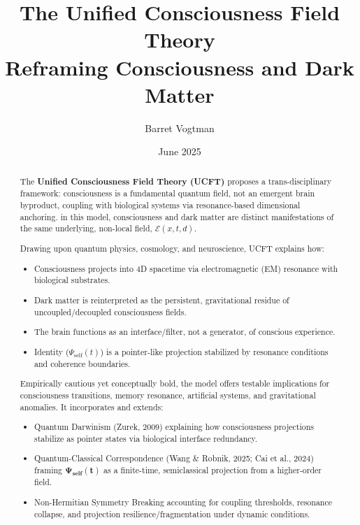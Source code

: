 \documentclass[titlepage]{article}
\title{The Unified Consciousness Field Theory\\
\large Reframing Consciousness and Dark Matter}
\author{Barret Vogtman}
\date{June 2025}
\begin{document}
\maketitle
{}
\setcounter{page}{1}  

\begin{abstract}
\thispagestyle{plain}
The \textbf{Unified Consciousness Field Theory (UCFT)} proposes a trans-disciplinary framework: consciousness is a fundamental quantum field, not an emergent brain byproduct, coupling with biological systems via resonance-based dimensional anchoring. in this model, consciousness and dark matter are distinct manifestations of the same underlying, non-local field, $\mathcal{E}(x,t,d)$.

Drawing upon quantum physics, cosmology, and neuroscience, UCFT explains how:

\begin{itemize}
\item Consciousness projects into 4D spacetime via electromagnetic (EM) resonance with biological substrates.
\item Dark matter is reinterpreted as the persistent, gravitational residue of uncoupled/decoupled consciousness fields.
\item The brain functions as an interface/filter, not a generator, of conscious experience.
\item Identity ($\Psi_{\text{self}}(t)$) is a pointer-like projection stabilized by resonance conditions and coherence boundaries.
\end{itemize}

Empirically cautious yet conceptually bold, the model offers testable implications for consciousness transitions, memory resonance, artificial systems, and gravitational anomalies. It incorporates and extends:

\begin{itemize}
\item Quantum Darwinism (Zurek, 2009) explaining how consciousness projections stabilize as pointer states via biological interface redundancy.
\item Quantum-Classical Correspondence (Wang \& Robnik, 2025; Cai et al., 2024) framing $\bm{\Psi_{\text{self}}(t)}$ as a finite-time, semiclassical projection from a higher-order field.
\item Non-Hermitian Symmetry Breaking accounting for coupling thresholds, resonance collapse, and projection resilience/fragmentation under dynamic conditions.
\end{itemize}


\end{abstract}
\end{document}
